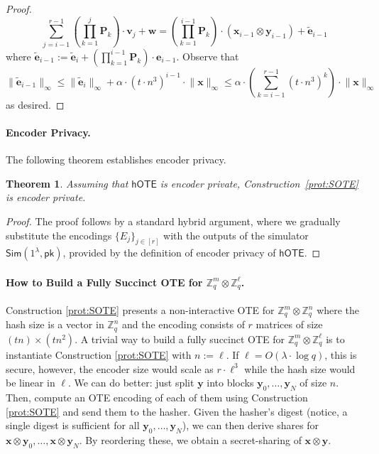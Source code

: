 \documentclass{article}
\newtheorem{theorem}{Theorem}\newtheorem{lemma}[theorem]{Lemma}\newtheorem{proposition}[theorem]{Proposition}\newtheorem{corollary}[theorem]{Corollary}\newtheorem{definition}[theorem]{Definition}\newtheorem{claim}[theorem]{Claim}
\newcommand{\BOTE}{\mathsf{hOTE}}
\newcommand{\Z}{\mathbb{Z}}
\renewcommand{\sec}{\ensuremath{\lambda}}
\newcommand{\Sim}{\mathsf{Sim}}
\newcommand{\pk}{{\mathsf{pk}}}
\begin{document}
\begin{proof}
\[\sum_{j=i-1}^{r-1} \left(\prod_{k=1}^{j} \mathbf{P}_k\right)\cdot\mathbf{v}_j+\mathbf{w}=\left(\prod_{k=1}^{i-1} \mathbf{P}_k\right)\cdot(\mathbf{x}_{i-1}\otimes \mathbf{y}_{i-1})+\widetilde{\mathbf{e}}_{i-1}\]
where $\widetilde{\mathbf{e}}_{i-1}:=\widetilde{\mathbf{e}}_{i}+\left(\prod_{k=1}^{i-1} \mathbf{P}_k\right)\cdot \mathbf{e}_{i-1}$.
Observe that \[\lVert\widetilde{\mathbf{e}}_{i-1}\rVert_\infty\le \lVert\widetilde{\mathbf{e}}_{i}\rVert_\infty+\alpha\cdot (t\cdot n^3)^{i-1}\cdot\lVert\mathbf{x}\rVert_\infty\le \alpha\cdot \left(\sum_{k=i-1}^{r-1} (t \cdot n^3)^k\right)\cdot \lVert \mathbf{x}\rVert_\infty\]
as desired.
\end{proof}

\paragraph{Encoder Privacy.} The following theorem establishes encoder privacy.

\begin{theorem}
    Assuming that $\BOTE$ is encoder private, Construction~\ref{prot:SOTE} is encoder private.
\end{theorem}
\begin{proof}
    The proof follows by a standard hybrid argument, where we gradually substitute the encodings $\{E_j\}_{j\in[r]}$ with the outputs of the simulator $\Sim(1^\sec, \pk)$, provided by the definition of encoder privacy of $\BOTE$.
\end{proof}

\paragraph{How to Build a Fully Succinct OTE for $\Z_q^m\otimes \Z_q^\ell$.}
Construction \ref{prot:SOTE} presents a non-interactive OTE for $\Z_q^m\otimes \Z_q^n$ where the hash size is a vector in $\Z_q^n$ and the encoding consists of $r$ matrices of size $(tn)\times (tn^2)$. A trivial way to build a fully succinct OTE for $\Z_q^m\otimes \Z_q^\ell$ is to instantiate Construction \ref{prot:SOTE} with $n:=\ell$. If $\ell=O(\sec\cdot \log q)$, this is secure, however, the encoder size would scale as $r\cdot \ell^3$ while the hash size would be linear in $\ell$. We can do better: just split $\mathbf{y}$ into blocks $\mathbf{y}_0, \dots, \mathbf{y}_N$ of size $n$. Then, compute an OTE encoding of each of them using Construction \ref{prot:SOTE} and send them to the hasher. Given the hasher's digest (notice, a single digest is sufficient for all $\mathbf{y}_0, \dots, \mathbf{y}_N$), we can then derive shares for $\mathbf{x}\otimes \mathbf{y}_0, \dots, \mathbf{x}\otimes \mathbf{y}_N$. By reordering these, we obtain a secret-sharing of $\mathbf{x}\otimes \mathbf{y}$. 
\end{document}
